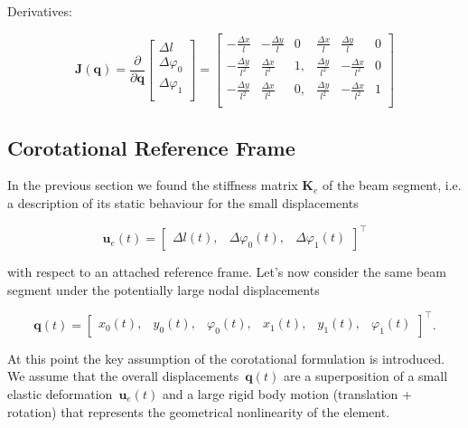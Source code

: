 Derivatives:

\begin{equation}
\renewcommand\arraystretch{1.5}
\boldsymbol{J}(\boldsymbol{q}) =
\frac{\partial}{\partial\boldsymbol{q}}
\begin{bmatrix}
\Delta l \\
\Delta \varphi_0 \\
\Delta \varphi_1 \\
\end{bmatrix}
=
\begin{bmatrix}
-\frac{\Delta x}{l} & -\frac{\Delta y}{l} & 0 & \frac{\Delta x}{l} & \frac{\Delta y}{l} & 0 \\
-\frac{\Delta y}{l^2} & \frac{\Delta x}{l^2} & 1, & \frac{\Delta y}{l^2} & -\frac{\Delta x}{l^2} & 0 \\
-\frac{\Delta y}{l^2} & \frac{\Delta x}{l^2} & 0, & \frac{\Delta y}{l^2} & -\frac{\Delta x}{l^2} & 1 \\
\end{bmatrix}
\end{equation}

\newpage



\newpage
\subsection{Corotational Reference Frame}

In the previous section we found the stiffness matrix $\boldsymbol{K}_e$ of the beam segment, i.e. a description of its static behaviour for the small displacements

\begin{equation}
\boldsymbol{u}_e(t) = \begin{bmatrix}
\Delta l(t), & \Delta \varphi_0(t), & \Delta \varphi_1(t)
\end{bmatrix}^\intercal
\end{equation}

with respect to an attached reference frame.
Let's now consider the same beam segment under the potentially large nodal displacements

\begin{equation}
\boldsymbol{q}(t) = \begin{bmatrix}
x_{0}(t), & y_{0}(t), & \varphi_0(t), & x_{1}(t), & y_{1}(t), & \varphi_1(t)
\end{bmatrix}^\intercal.
\end{equation}

At this point the key assumption of the corotational formulation is introduced.
We assume that the overall displacements~$\boldsymbol{q}(t)$ are a superposition of a small elastic deformation~$\boldsymbol{u}_e(t)$ and a large rigid body motion (translation + rotation) that represents the geometrical nonlinearity of the element.

